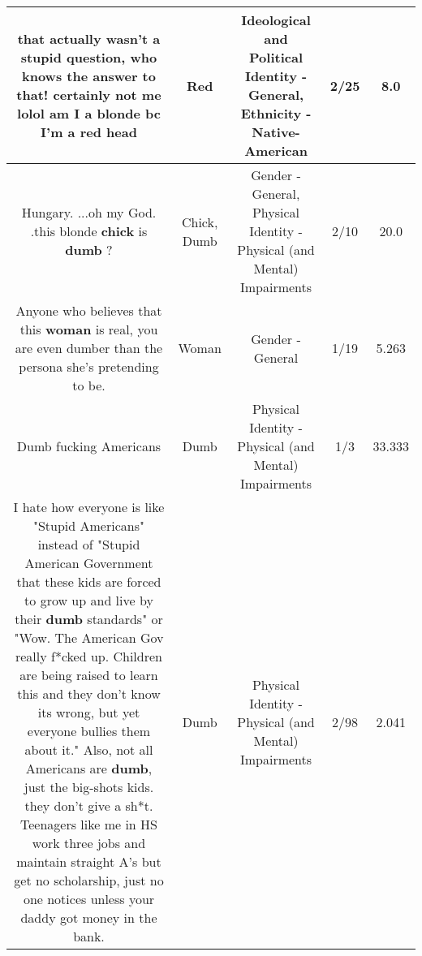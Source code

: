 \documentclass[11pt]{article}
\newlength\mylength
\begin{document}
\begin{center}
\begin{longtable}{|C{.65\mylength}|C{.30\mylength}|C{.12\mylength}|C{.12\mylength}|C{.12\mylength}|}
  \small that actually wasn't a stupid question, who knows the answer to that! certainly not me lolol am I a blonde bc I'm a \textbf{r\textbf{ed}} head\normalsize   & Red &  Ideological and Political Identity - General, Ethnicity - Native-American & 2/25 & 8.0 \\  \hline
  \small Hungary. ...oh my God. .this blonde \textbf{chick} is \textbf{dumb} ?\normalsize   & Chick, Dumb & Gender - General, Physical Identity - Physical (and Mental) Impairments & 2/10 & 20.0 \\  \hline
  \small Anyone who believes that this \textbf{woman} is real, you are even dumber than the persona she's pretending to be.\normalsize   & Woman & Gender - General & 1/19 & 5.263 \\  \hline
  \small Dumb fucking Americans\normalsize   & Dumb & Physical Identity - Physical (and Mental) Impairments & 1/3 & 33.333 \\  \hline
  \small I hate how everyone is like "Stupid Americans" instead of "Stupid American Government that these kids are forced to grow up and live by their \textbf{dumb} standards" or "Wow. The American Gov really f*cked up. Children are being raised to learn this and they don't know its wrong, but yet everyone bullies them about it." Also, not all Americans are \textbf{dumb}, just the big-shots kids. they don't give a sh*t. Teenagers like me in HS work three jobs and maintain straight A's but get no scholarship, just no one notices unless your daddy got money in the bank.\normalsize   & Dumb & Physical Identity - Physical (and Mental) Impairments & 2/98 & 2.041 \\  \hline

\end{longtable}
\end{center}
\end{document}
